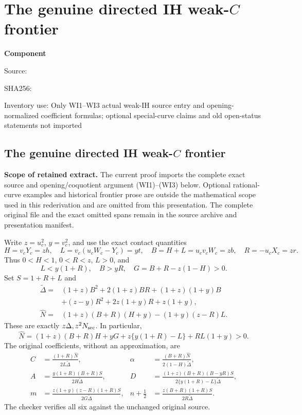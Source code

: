 \chapter{The genuine directed IH weak-$C$ frontier}
\label{component:p93b05ea6ad1e}
\noindent\textbf{Component }\par
{\small\noindent Source: \par}
{\small\noindent SHA256: \par}
{\small\noindent Inventory use: Only WI1--WI3 actual weak-IH source entry and opening-normalized coefficient formulas; optional special-curve claims and old open-status statements not imported\par}
\medskip
\section[The genuine directed IH weak-C frontier]{The genuine directed IH weak-$C$ frontier}
\label{p93b05ea6ad1e:sec:c2-weak-ih-frontier}

\noindent\textbf{Scope of retained extract.} The current proof imports the complete exact source and opening/coquotient argument (WI1)--(WI3) below. Optional rational-curve examples and historical frontier prose are outside the mathematical scope used in this rederivation and are omitted from this presentation. The complete original file and the exact omitted spans remain in the source archive and presentation manifest.



Write $z=u_c^2$, $y=v_c^2$, and use the exact contact quantities
\[
 H=v_cY_c=zh,\quad L=v_c(u_cW_c-Y_c)=yt,\quad
 B=H+L=u_cv_cW_c=zb,\quad R=-u_cX_c=zr.
\]
Thus $0<H<1$, $0<R<z$, $L>0$, and
\[
 L<y(1+R),\quad B>yR,\quad
 G=B+R-z(1-H)>0.
\]
Set $S=1+R+L$ and
\begin{align*}
 \widetilde\Delta={}&(1+z)B^2+2(1+z)BR+(1+z)(1+y)B\\
 &+(z-y)R^2+2z(1+y)R+z(1+y),\\
 \widehat N={}&(1+z)(B+R)(H+y)-(1+y)(z-R)L.
\end{align*}
These are exactly $z\Delta,z^2N_{\rm src}$. In particular,
\[
 \widehat N=(1+z)(B+R)H+yG+z\{y(1+R)-L\}+RL(1+y)>0.
\]
The original coefficients, without an approximation, are
\begin{align*}
 C&=\frac{(1+R)\widehat N}{2L\widetilde\Delta},&
 \alpha&=\frac{(B+R)\widehat N}{2(1-H)\widetilde\Delta},\\
 A&=\frac{y(1+R)(B+R)S}{2H\widetilde\Delta},&
 D&=\frac{(1+z)(B+R)(B-yR)S}
 {2\{y(1+R)-L\}\widetilde\Delta},\\
 m&=\frac{z(1+y)(z-R)(1+R)S}{2G\widetilde\Delta},&
 n+\frac12&=\frac{z(B+R)(1+R)S}{2R\widetilde\Delta}.
                                                        \tag{WI1}
\end{align*}
The checker verifies all six against the unchanged original source.

